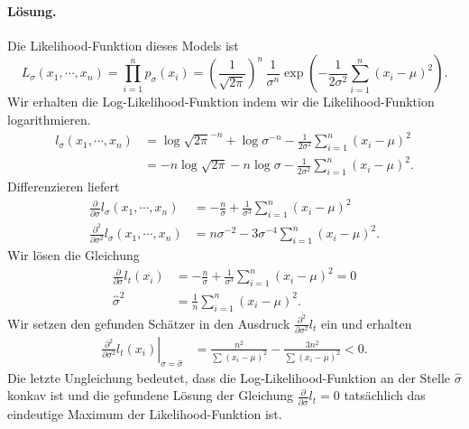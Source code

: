 \paragraph*{Lösung.} Die Likelihood-Funktion dieses Models ist 
\begin{equation*}
    L_{\sigma}(x_1, \cdots, x_n) = \prod_{i=1}^{n} p_{\sigma}(x_i) = 
    \left( \frac{1}{\sqrt{2\pi}} \right)^n \, \frac{1}{\sigma^n} 
    \exp \left( - \frac{1}{2 \sigma^2} \sum_{i=1}^{n} \left( x_i - \mu \right)^2 \right).
\end{equation*}
Wir erhalten die Log-Likelihood-Funktion indem wir die Likelihood-Funktion 
logarithmieren. 
\begin{align*}
    l_\sigma (x_1, \cdots, x_n) &= \log \sqrt{2\pi}^{-n} + \log \sigma^{-n} 
    - \frac{1}{2 \sigma^2} \sum_{i=1}^{n} \left( x_i - \mu \right)^2   \\
    &= - n\log \sqrt{2 \pi} -n \log \sigma 
    - \frac{1}{2\sigma^2} \sum_{i=1}^{n} \left( x_i - \mu \right)^2.
\end{align*}
Differenzieren liefert
\begin{align*}
    \frac{\partial}{\partial \sigma} l_\sigma(x_1, \cdots, x_n) &= 
    - \frac{n}{\sigma} + \frac{1}{\sigma^3} \sum_{i=1}^{n} \left( x_i - \mu \right)^2 \\
    \frac{\partial^2}{\partial \sigma^2} l_\sigma(x_1, \cdots, x_n) &= 
    n \sigma^{-2} - 3 \sigma^{-4} \sum_{i=1}^{n} \left( x_i - \mu \right)^2. 
\end{align*}
Wir lösen die Gleichung
\begin{align*}
    \frac{\partial}{\partial \sigma} l_t (x_i ) &= 
    - \frac{n}{\sigma} + \frac{1}{\sigma^3} \sum_{i=1}^{n} \left( x_i - \mu \right)^2  = 0 \\
    \hat \sigma^2 &= \frac{1}{n} \sum_{i=1}^{n} \left( x_i - \mu \right)^2. 
\end{align*}
Wir setzen den gefunden Schätzer in den Ausdruck $\frac{\partial^2}{\partial \sigma^2} l_t$
ein und erhalten
\begin{align*}
    \left. \frac{\partial^2}{\partial \sigma^2} l_t(x_i) \right|_{\sigma=\hat\sigma} 
    &= \frac{n^2}{ \sum_{}^{} (x_i-\mu)^2} - \frac{3 n^2}{\sum_{}^{} (x_i -\mu)^2} < 0.
\end{align*}
Die letzte Ungleichung bedeutet, dass die Log-Likelihood-Funktion an der Stelle
$\hat\sigma$ konkav ist und die gefundene Lösung der Gleichung
$\frac{\partial}{\partial \sigma}l_t = 0$ tatsächlich das eindeutige Maximum
der Likelihood-Funktion ist.




